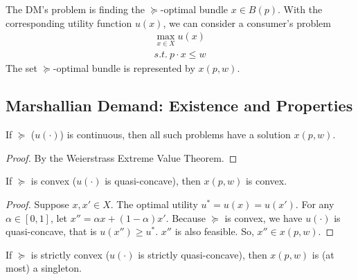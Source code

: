 \documentclass[11pt]{elegantbook}
\begin{document}
The DM's problem is finding the $\succeq$-optimal bundle $x\in B(p)$. With the corresponding utility function $u(x)$, we can consider a consumer's problem
\begin{equation}
    \begin{aligned}
        \max_{x\in X} u(x)\\
        s.t.\ p\cdot x\leq w
    \end{aligned}
    \tag{UMP}
    \label{UMP}
\end{equation}
The set $\succeq$-optimal bundle is represented by $x(p,w)$.

\subsection{Marshallian Demand: Existence and Properties}

\begin{proposition}
    If $\succeq$ ($u(\cdot)$) is continuous, then all such problems have a solution $x(p,w)$.
\end{proposition}
\begin{proof}
    By the Weierstrass Extreme Value Theorem.
\end{proof}

\begin{proposition}
    If $\succeq$ is convex ($u(\cdot)$ is quasi-concave), then $x(p,w)$ is convex.
\end{proposition}
\begin{proof}
    Suppose $x,x'\in X$. The optimal utility $u^*=u(x)=u(x')$. For any $\alpha\in[0,1]$, let $x''=\alpha x+(1-\alpha)x'$. Because $\succeq$ is convex, we have $u(\cdot)$ is quasi-concave, that is $u(x'')\geq u^*$. $x''$ is also feasible. So, $x''\in x(p,w)$.
\end{proof}

\begin{proposition}
    If $\succeq$ is strictly convex ($u(\cdot)$ is strictly quasi-concave), then $x(p,w)$ is (at most) a singleton.
\end{proposition}
\end{document}
